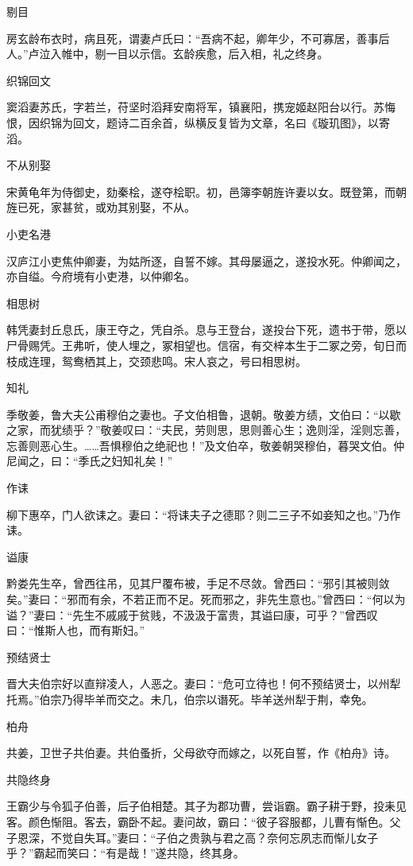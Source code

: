 \documentclass[a4paper,12pt,UTF8,twoside]{ctexbook}
\begin{document}
    剔目
    
    房玄龄布衣时，病且死，谓妻卢氏曰：“吾病不起，卿年少，不可寡居，善事后人。”卢泣入帷中，剔一目以示信。玄龄疾愈，后入相，礼之终身。
    
    织锦回文
    
    窦滔妻苏氏，字若兰，苻坚时滔拜安南将军，镇襄阳，携宠姬赵阳台以行。苏悔恨，因织锦为回文，题诗二百余首，纵横反复皆为文章，名曰《璇玑图》，以寄滔。
    
    不从别娶
    
    宋黄龟年为侍御史，劾秦桧，遂夺桧职。初，邑簿李朝旌许妻以女。既登第，而朝旌已死，家甚贫，或劝其别娶，不从。
    
    小吏名港
    
    汉庐江小吏焦仲卿妻，为姑所逐，自誓不嫁。其母屡逼之，遂投水死。仲卿闻之，亦自缢。今府境有小吏港，以仲卿名。
    
    相思树
    
    韩凭妻封丘息氏，康王夺之，凭自杀。息与王登台，遂投台下死，遗书于带，愿以尸骨赐凭。王弗听，使人埋之，冢相望也。信宿，有交梓本生于二冢之旁，旬日而枝成连理，鸳鸯栖其上，交颈悲鸣。宋人哀之，号曰相思树。
    
    知礼
    
    季敬姜，鲁大夫公甫穆伯之妻也。子文伯相鲁，退朝。敬姜方绩，文伯曰：“以歇之家，而犹绩乎？”敬姜叹曰：“夫民，劳则思，思则善心生；逸则淫，淫则忘善，忘善则恶心生。……吾惧穆伯之绝祀也！”及文伯卒，敬姜朝哭穆伯，暮哭文伯。仲尼闻之，曰：“季氏之妇知礼矣！”
    
    作诔
    
    柳下惠卒，门人欲诔之。妻曰：“将诔夫子之德耶？则二三子不如妾知之也。”乃作诔。
    
    谥康
    
    黔娄先生卒，曾西往吊，见其尸覆布被，手足不尽敛。曾西曰：“邪引其被则敛矣。”妻曰：“邪而有余，不若正而不足。死而邪之，非先生意也。”曾西曰：“何以为谥？”妻曰：“先生不戚戚于贫贱，不汲汲于富贵，其谥曰康，可乎？”曾西叹曰：“惟斯人也，而有斯妇。”
    
    预结贤士
    
    晋大夫伯宗好以直辩凌人，人恶之。妻曰：“危可立待也！何不预结贤士，以州犁托焉。”伯宗乃得毕羊而交之。未几，伯宗以谮死。毕羊送州犁于荆，幸免。
    
    柏舟
    
    共姜，卫世子共伯妻。共伯蚤折，父母欲夺而嫁之，以死自誓，作《柏舟》诗。
    
    共隐终身
    
    王霸少与令狐子伯善，后子伯相楚。其子为郡功曹，尝诣霸。霸子耕于野，投耒见客。颜色惭阻。客去，霸卧不起。妻问故，霸曰：“彼子容服都，儿曹有惭色。父子恩深，不觉自失耳。”妻曰：“子伯之贵孰与君之高？奈何忘夙志而惭儿女子乎？”霸起而笑曰：“有是哉！”遂共隐，终其身。
    
\end{document}
